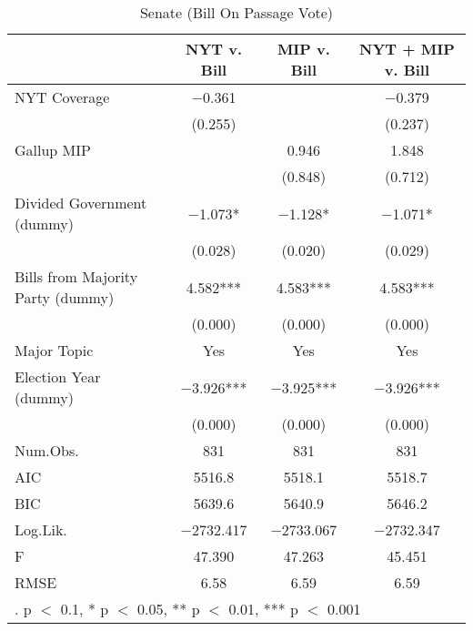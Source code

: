 \documentclass[here]{article}
\begin{document}
\begin{table}[h]

  \caption{Senate (Bill On Passage Vote)}
  \centering
  \begin{tabular}[t]{lccc}
  \toprule
    & NYT v. Bill & MIP v. Bill & NYT + MIP v. Bill\\
  \midrule
  NYT Coverage & \num{-0.361} &  & \num{-0.379}\\
   & (\num{0.255}) &  & (\num{0.237})\\
  Gallup MIP &  & \num{0.946} & \num{1.848}\\
   &  & (\num{0.848}) & (\num{0.712})\\
  Divided Government (dummy) & \num{-1.073}* & \num{-1.128}* & \num{-1.071}*\\
   & (\num{0.028}) & (\num{0.020}) & (\num{0.029})\\
  Bills from Majority Party (dummy) & \num{4.582}*** & \num{4.583}*** & \num{4.583}***\\
   & (\num{0.000}) & (\num{0.000}) & \vphantom{1} (\num{0.000})\\
  Major Topic & Yes & Yes & Yes\\
  Election Year (dummy) & \num{-3.926}*** & \num{-3.925}*** & \num{-3.926}***\\
   & (\num{0.000}) & (\num{0.000}) & (\num{0.000})\\
  Num.Obs. & \num{831} & \num{831} & \num{831}\\
  \midrule
  AIC & \num{5516.8} & \num{5518.1} & \num{5518.7}\\
  BIC & \num{5639.6} & \num{5640.9} & \num{5646.2}\\
  Log.Lik. & \num{-2732.417} & \num{-2733.067} & \num{-2732.347}\\
  F & \num{47.390} & \num{47.263} & \num{45.451}\\
  RMSE & \num{6.58} & \num{6.59} & \num{6.59}\\
  \bottomrule
  \multicolumn{4}{l}{\rule{0pt}{1em}. p $<$ 0.1, * p $<$ 0.05, ** p $<$ 0.01, *** p $<$ 0.001}\\
  \end{tabular}
  \end{table}
\end{document}
